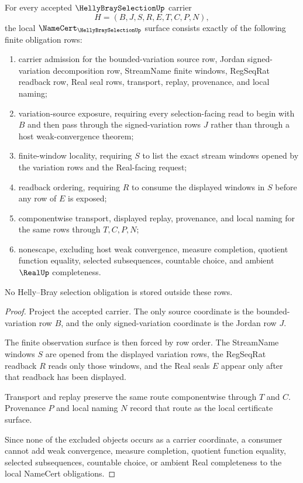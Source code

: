 \begin{theorem}
\label{thm:helly-bray-selection-namecert-obligations}
For every accepted $\HellyBraySelectionUp$ carrier
$$
H=(B,J,S,R,E,T,C,P,N),
$$
the local $\NameCert_{\HellyBraySelectionUp}$ surface consists exactly of the following finite obligation rows:
\begin{enumerate}
\item carrier admission for the bounded-variation source row, Jordan signed-variation decomposition row, StreamName finite windows, RegSeqRat readback row, Real seal rows, transport, replay, provenance, and local naming;
\item variation-source exposure, requiring every selection-facing read to begin with $B$ and then pass through the signed-variation rows $J$ rather than through a host weak-convergence theorem;
\item finite-window locality, requiring $S$ to list the exact stream windows opened by the variation rows and the Real-facing request;
\item readback ordering, requiring $R$ to consume the displayed windows in $S$ before any row of $E$ is exposed;
\item componentwise transport, displayed replay, provenance, and local naming for the same rows through $T,C,P,N$;
\item nonescape, excluding host weak convergence, measure completion, quotient function equality, selected subsequences, countable choice, and ambient $\RealUp$ completeness.
\end{enumerate}
No Helly--Bray selection obligation is stored outside these rows.
\end{theorem}
\begin{proof}
Project the accepted carrier. The only source coordinate is the bounded-variation row $B$, and the only signed-variation coordinate is the Jordan row $J$.

The finite observation surface is then forced by row order. The StreamName windows $S$ are opened from the displayed variation rows, the RegSeqRat readback $R$ reads only those windows, and the Real seals $E$ appear only after that readback has been displayed.

Transport and replay preserve the same route componentwise through $T$ and $C$. Provenance $P$ and local naming $N$ record that route as the local certificate surface.

Since none of the excluded objects occurs as a carrier coordinate, a consumer cannot add weak convergence, measure completion, quotient function equality, selected subsequences, countable choice, or ambient Real completeness to the local NameCert obligations.
\end{proof}

